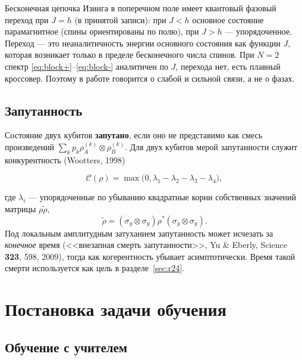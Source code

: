 \documentclass[12pt,a4paper]{report}
\numberwithin{equation}{chapter}
\begin{document}
Бесконечная цепочка Изинга в поперечном поле имеет квантовый фазовый переход
при $J=h$ (в принятой записи): при $J<h$ основное состояние парамагнитное
(спины ориентированы по полю), при $J>h$ --- упорядоченное. Переход --- это
неаналитичность энергии основного состояния как функции $J$, которая возникает
только в пределе бесконечного числа спинов. При $N=2$ спектр
\eqref{eq:block+}--\eqref{eq:block-} аналитичен по $J$, перехода нет, есть
плавный кроссовер. Поэтому в работе говорится о слабой и сильной связи, а не о
фазах.

\section{Запутанность}
\label{sec:entangle}

Состояние двух кубитов \textbf{запутано}, если оно не представимо как смесь
произведений $\sum_kp_k\rho_A^{(k)}\otimes\rho_B^{(k)}$. Для двух кубитов мерой
запутанности служит конкурентность (Wootters, 1998)
\begin{keybox}
\begin{equation}
\mathcal C(\rho)=\max\bigl(0,\lambda_1-\lambda_2-\lambda_3-\lambda_4\bigr),
\end{equation}
\end{keybox}
где $\lambda_i$ --- упорядоченные по убыванию квадратные корни собственных
значений матрицы $\rho\tilde\rho$,
\[
\tilde\rho=(\sigma_y\otimes\sigma_y)\rho^*(\sigma_y\otimes\sigma_y).
\]
Под
локальным амплитудным затуханием запутанность может исчезать за
\emph{конечное} время (<<внезапная смерть запутанности>>, Yu \& Eberly,
Science \textbf{323}, 598, 2009), тогда как когерентность убывает
асимптотически. Время такой смерти используется как цель в
разделе~\ref{sec:r24}.

\chapter{Постановка задачи обучения}
\label{chap:learning}

\section{Обучение с учителем}
\end{document}
